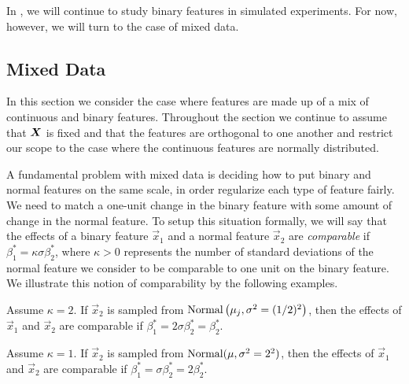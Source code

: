 In , we will continue to study binary features in simulated
experiments. For now, however, we will turn to the case of mixed data.

\subsection{Mixed Data}\label{sec:mixed-data}

In this section we consider the case where features are made up of a mix of continuous and
binary features. Throughout the section we continue to assume that \(\boldsymbol{X}\) is fixed and
that the features are orthogonal to one another and restrict our scope to the case where
the continuous features are normally distributed.

A fundamental problem with mixed data is deciding how to put binary and normal features on
the same scale, in order regularize each type of feature fairly. We need to match a
one-unit change in the binary feature with some amount of change in the normal feature. To
setup this situation formally, we will say that the effects of a binary feature
\(\vec{x}_1\) and a normal feature \(\vec{x}_2\) are \emph{comparable} if \(\beta^*_1 =
\kappa \sigma \beta^*_2\), where \(\kappa > 0\) represents the number of standard
deviations of the normal feature we consider to be comparable to one unit on the binary
feature. We illustrate this notion of comparability by the following examples.

\begin{example}
  Assume \(\kappa = 2\). If \(\vec{x}_2\) is sampled from
  \(\operatorname{Normal}\left(\mu_j, \sigma^2 = (1/2)^2\right)\), then the effects of \(\vec{x}_1\) and
  \(\vec{x}_2\) are comparable if \(\beta_1^* = 2\sigma \beta_2^* = \beta_2^*\).
\end{example}
\begin{example}
  Assume \(\kappa = 1\). If \(\vec{x}_2\) is sampled from \(\operatorname{Normal}(\mu,
  \sigma^2 = 2^2)\), then the effects of \(\vec{x}_1\) and \(\vec{x}_2\) are comparable if
  \(\beta_1^* = \sigma\beta_2^* = 2\beta_2^*\).
\end{example}


